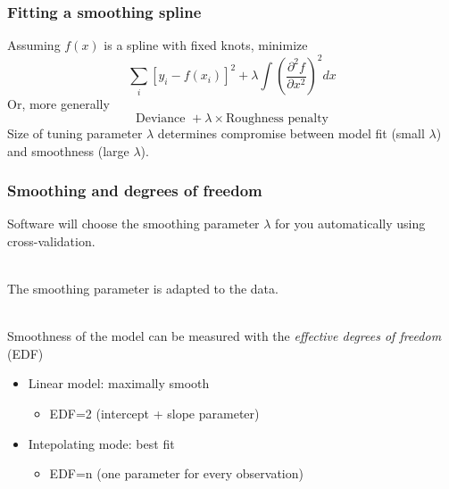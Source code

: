 \documentclass[aspectratio=169]{beamer}
\begin{document}
\begin{frame}
  \frametitle{Fitting a smoothing spline}

  Assuming $f(x)$ is a spline with fixed knots, minimize
  \[
  \sum_i \left[ y_i - f(x_i) \right]^2 + \lambda
  \int \left(
  \frac{\partial^2 f}{\partial x^2}
  \right)^2 dx
  \]
  Or, more generally
  \[
  \text{Deviance } + \lambda \times \text{Roughness penalty}
  \]
  Size of tuning parameter $\lambda$ determines compromise between model fit
  (small $\lambda$) and smoothness (large $\lambda$).

\end{frame}

\begin{frame}
  \frametitle{Smoothing and degrees of freedom}
  
  Software will choose the smoothing parameter $\lambda$ for you
  automatically using cross-validation.

  ~\\
  The smoothing parameter is adapted to the data.

  ~\\
  Smoothness of the model can be measured with the {\em effective
    degrees of freedom} (EDF)
  \begin{itemize}
  \item Linear model: maximally smooth
    \begin{itemize}
    \item EDF=2 (intercept + slope parameter)
    \end{itemize}
  \item Intepolating mode: best fit
    \begin{itemize}
    \item EDF=n (one parameter for every observation)
    \end{itemize}
  \end{itemize}
  
\end{frame}
  

  
\end{document}

